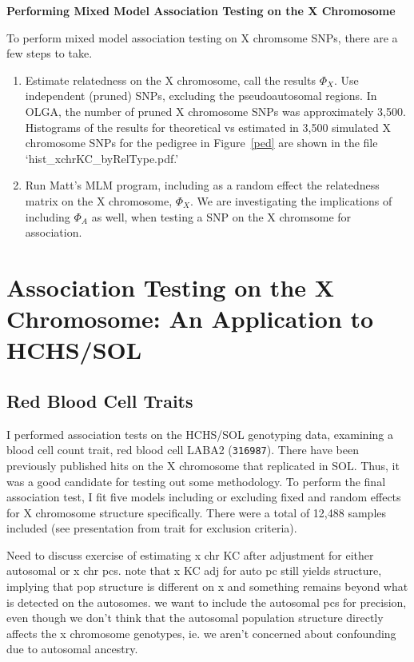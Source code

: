 \documentclass[11pt]{article} %
\begin{document}
\newpage
\textbf{Performing Mixed Model Association Testing on the X Chromosome}

To perform mixed model association testing on X chromsome SNPs, there are a few steps to take.
\begin{enumerate}
\item Estimate relatedness on the X chromosome, call the results $\Phi_X$. Use independent (pruned) SNPs, excluding the pseudoautosomal regions. In OLGA, the number of pruned X chromosome SNPs was approximately 3,500. Histograms of the results for theoretical vs estimated in 3,500 simulated X chromosome SNPs for the pedigree in Figure~\ref{ped} are shown in the file `hist\_xchrKC\_byRelType.pdf.' 
\item Run Matt's MLM program, including as a random effect the relatedness matrix on the X chromosome, $\Phi_X$. We are investigating the implications of including $\Phi_A$ as well, when testing a SNP on the X chromsome for association.
\end{enumerate}




\clearpage
\newpage
\normalsize
\section*{Association Testing on the X Chromosome: An Application to HCHS/SOL}

\subsection*{Red Blood Cell Traits}
I performed association tests on the HCHS/SOL genotyping data, examining a blood cell count trait, red blood cell LABA2 (\texttt{316987}). There have been previously published hits on the X chromosome that replicated in SOL. Thus, it was a good candidate for testing out some methodology.
To perform the final association test, I fit five models including or excluding fixed and random effects for X chromosome structure specifically. There were a total of 12,488 samples included (see presentation from trait for exclusion criteria).

Need to discuss exercise of estimating x chr KC after adjustment for either autosomal or x chr pcs.
note that x KC adj for auto pc still yields structure, implying that pop structure is different on x and something remains beyond what is detected on the autosomes. we want to include the autosomal pcs for precision, even though we don't think that the autosomal population structure directly affects the x chromosome genotypes, ie. we aren't concerned about confounding due to autosomal ancestry.
\end{document}
